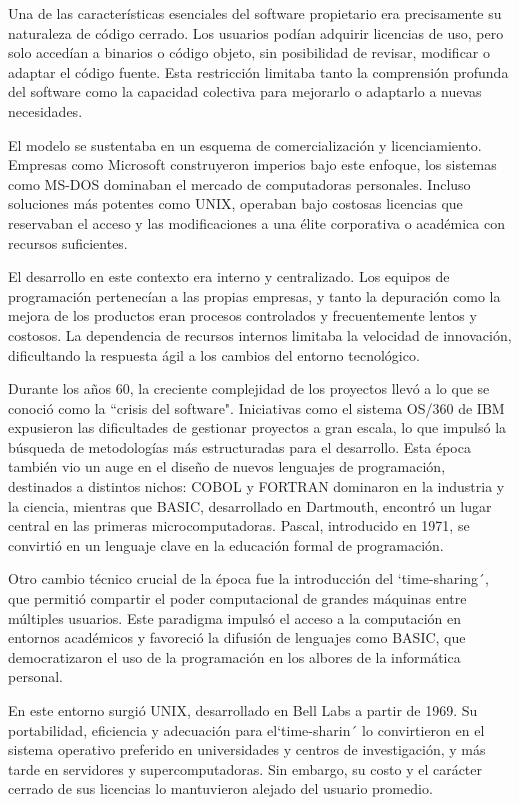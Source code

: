 \documentclass[a4paper,12pt]{article}
\begin{document}
Una de las características esenciales del software propietario era precisamente
su naturaleza de código cerrado. Los usuarios podían adquirir licencias de uso,
pero solo accedían a binarios o código objeto, sin posibilidad de revisar,
modificar o adaptar el código fuente. Esta restricción limitaba tanto la
comprensión profunda del software como la capacidad colectiva para mejorarlo o
adaptarlo a nuevas necesidades.

El modelo se sustentaba en un esquema de comercialización y licenciamiento.
Empresas como Microsoft construyeron imperios bajo este enfoque, los sistemas
como MS-DOS dominaban el mercado de computadoras personales. Incluso soluciones
más potentes como UNIX, operaban bajo costosas licencias que reservaban el
acceso y las modificaciones a una élite corporativa o académica con recursos
suficientes.

El desarrollo en este contexto era interno y centralizado. Los equipos de
programación pertenecían a las propias empresas, y tanto la depuración como la
mejora de los productos eran procesos controlados y frecuentemente lentos y
costosos. La dependencia de recursos internos limitaba la velocidad de
innovación, dificultando la respuesta ágil a los cambios del entorno
tecnológico.

Durante los años 60, la creciente complejidad de los proyectos llevó a lo que se
conoció como la ``crisis del software". Iniciativas como el sistema OS/360 de IBM
expusieron las dificultades de gestionar proyectos a gran escala, lo que impulsó
la búsqueda de metodologías más estructuradas para el desarrollo. Esta época
también vio un auge en el diseño de nuevos lenguajes de programación, destinados
a distintos nichos: COBOL y FORTRAN dominaron en la industria y la ciencia,
mientras que BASIC, desarrollado en Dartmouth, encontró un lugar central en las
primeras microcomputadoras. Pascal, introducido en 1971, se convirtió en un
lenguaje clave en la educación formal de programación.

Otro cambio técnico crucial de la época fue la introducción del `time-sharing´,
que permitió compartir el poder computacional de grandes máquinas entre
múltiples usuarios. Este paradigma impulsó el acceso a la computación en
entornos académicos y favoreció la difusión de lenguajes como BASIC, que
democratizaron el uso de la programación en los albores de la informática
personal.

En este entorno surgió UNIX, desarrollado en Bell Labs a partir de 1969. Su
portabilidad, eficiencia y adecuación para el`time-sharin´ lo convirtieron en el
sistema operativo preferido en universidades y centros de investigación, y más
tarde en servidores y supercomputadoras. Sin embargo, su costo y el carácter
cerrado de sus licencias lo mantuvieron alejado del usuario promedio.
\end{document}
